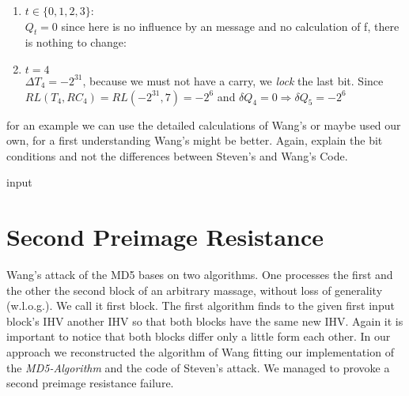 \begin{enumerate}
    \item $t \in \{0,1,2,3\}$:\\
     $Q_t = 0 $ since here is no influence by an message and no calculation of f, there is nothing to change:
    \item $t = 4$\\
    $\Delta T_4 = -2^{31}$, because we must not have a carry, we \textit{lock} the last bit.
    Since  $RL(T_4, RC_4) = RL(-2^{31}, 7) = -2^6 $ and $\delta Q_4 = 0 \Rightarrow  \delta Q_5 = -2^6$  
\end{enumerate}
for an example we can use the detailed calculations of Wang's or maybe used our own, for a first understanding Wang's might be better.
Again, explain the bit conditions and not the differences between Steven's and Wang's Code.

\vfill
input 
\newpage

\section{Second Preimage Resistance}
Wang's attack of the MD5 bases on two algorithms. One processes the first and the other the second block of an arbitrary massage, without loss of generality (w.l.o.g.). We call it first block.
The first algorithm finds to the given first input block's IHV another IHV so that both blocks have the same new IHV.
Again it is important to notice that both blocks differ only a little form each other.     
In our approach we reconstructed the algorithm of Wang fitting our implementation of the \textit{MD5-Algorithm} and the code of Steven's attack.
We managed to provoke a second preimage resistance failure.  

